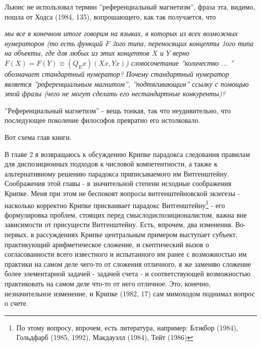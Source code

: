 \documentclass{book}
\begin{document}
Льюис не использовал термин ''референциальный магнетизм'', фраза эта, видимо, пошла от Ходса (1984, 135), вопрошающего, как так получается, что

\smallskip

\textit{мы все в конечном итоге говорим на языках, в которых из всех возможных нумераторов (то есть функций \begin{math}F\end{math} 2ого типа, переносящих концепты 1ого типа на объекты, где для любых из этих концептов \begin{math}X\end{math} и \begin{math}Y\end{math} верно \begin{math}F(X)=F(Y)\equiv (Q_{E}x)(Xx, Yx)\end{math}) словосочетание ''количество ... '' обозначает стандартный нумератор? Почему стандартный нумератор является ''референциальным магнитом'', ''подтягивающим'' ссылку с помощью этой фразы (чего не могут сделать его нестандартные конкуренты)?}

\smallskip

''Референциальный магнетизм'' - вещь тонкая, так что неудивительно, что последующее поколение философов превратно его истолковало.

Вот схема глав книги.

В главе 2 я возвращаюсь к обсуждению Крипке парадокса следования правилам для диспозиционных подходов к числовой компетентности, а также к альтернативному решению парадокса приписываемого им Витгенштейну. Соображения этой главы - в значительной степени исходные соображения Крипке. Меня при этом не беспокоят вопросы витгенштейновской экзегезы - насколько корректно Крипке присваивает парадокс Витгенштейну\footnote{По этому вопросу, впрочем, есть литература, например: Блэкбор (1984), Гольдфарб (1985, 1992), Макдауэлл (1984), Тейт (1986)} - его формулировка проблем, стоящих перед смыслодиспозиционалистом, важна вне зависимости от присущести Витгенштейну. Есть, впрочем, два изменения. Во-первых, в рассуждениях Крипке центральным примером выступает субъект, практикующий арифметическое сложение, и скептический вызов о согласованности всего известного и испытанного им ранее с возможностью им практики на самом деле чего-то от сложения отличного, я же заменяю сложение более элементарной задачей - задачей счета - и соответствующей возможностью практиковать на самом деле что-то от него отличное. Это, конечно, незначительное изменение, и Крипке (1982, 17) сам мимоходом поднимал вопрос о счете.
\end{document}
